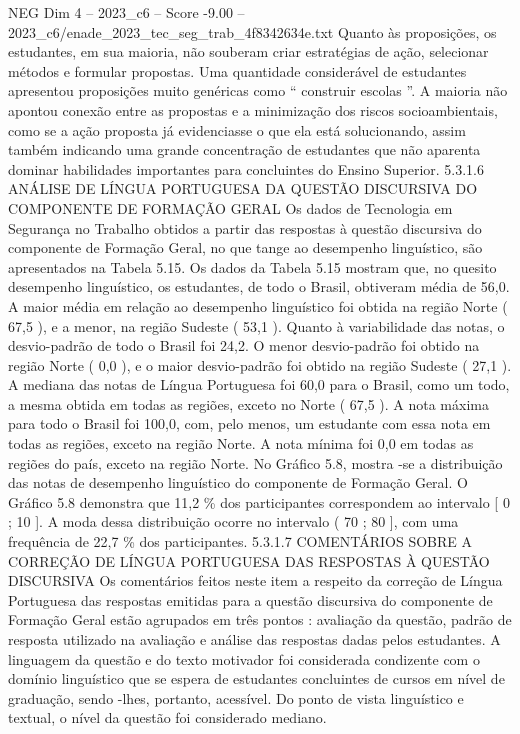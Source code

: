 \begin{textsample}{NEG Dim 4 – 2023\_c6 – Score -9.00 – 2023\_c6/enade\_2023\_tec\_seg\_trab\_4f8342634e.txt}
Quanto às proposições, os estudantes, em sua maioria, não souberam criar estratégias de ação, selecionar métodos e formular propostas.
Uma quantidade considerável de estudantes apresentou proposições muito genéricas como “ construir escolas ”.
A maioria não apontou conexão entre as propostas e a minimização dos riscos socioambientais, como se a ação proposta já evidenciasse o que ela está solucionando, assim também indicando uma grande concentração de estudantes que não aparenta dominar habilidades importantes para concluintes do Ensino Superior. 5.3.1.6 ANÁLISE DE LÍNGUA PORTUGUESA DA QUESTÃO DISCURSIVA DO COMPONENTE DE FORMAÇÃO GERAL Os dados de Tecnologia em Segurança no Trabalho obtidos a partir das respostas à questão discursiva do componente de Formação Geral, no que tange ao desempenho linguístico, são apresentados na Tabela 5.15.
Os dados da Tabela 5.15 mostram que, no quesito desempenho linguístico, os estudantes, de todo o Brasil, obtiveram média de 56,0.
A maior média em relação ao desempenho linguístico foi obtida na região Norte ( 67,5 ), e a menor, na região Sudeste ( 53,1 ).
Quanto à variabilidade das notas, o desvio-padrão de todo o Brasil foi 24,2.
O menor desvio-padrão foi obtido na região Norte ( 0,0 ), e o maior desvio-padrão foi obtido na região Sudeste ( 27,1 ).
A mediana das notas de Língua Portuguesa foi 60,0 para o Brasil, como um todo, a mesma obtida em todas as regiões, exceto no Norte ( 67,5 ).
A nota máxima para todo o Brasil foi 100,0, com, pelo menos, um estudante com essa nota em todas as regiões, exceto na região Norte.
A nota mínima foi 0,0 em todas as regiões do país, exceto na região Norte.
No Gráfico 5.8, mostra -se a distribuição das notas de desempenho linguístico do componente de Formação Geral.
O Gráfico 5.8 demonstra que 11,2 \% dos participantes correspondem ao intervalo [ 0 ; 10 ].
A moda dessa distribuição ocorre no intervalo ( 70 ; 80 ], com uma frequência de 22,7 \% dos participantes. 5.3.1.7 COMENTÁRIOS SOBRE A CORREÇÃO DE LÍNGUA PORTUGUESA DAS RESPOSTAS À QUESTÃO DISCURSIVA Os comentários feitos neste item a respeito da correção de Língua Portuguesa das respostas emitidas para a questão discursiva do componente de Formação Geral estão agrupados em três pontos : avaliação da questão, padrão de resposta utilizado na avaliação e análise das respostas dadas pelos estudantes.
A linguagem da questão e do texto motivador foi considerada condizente com o domínio linguístico que se espera de estudantes concluintes de cursos em nível de graduação, sendo -lhes, portanto, acessível.
Do ponto de vista linguístico e textual, o nível da questão foi considerado mediano.

\end{textsample}

